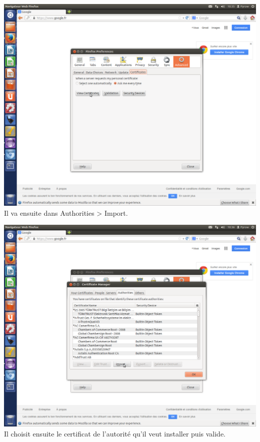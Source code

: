 \documentclass[a4paper,11pt,french]{article}
\begin{document}
\includegraphics[width=\textwidth]{images/OngletCert.png}
\newpage
Il va ensuite dans Authorities > Import.

\includegraphics[width=\textwidth]{images/OngletCA.png}
\newpage
Il choisit ensuite le certificat de l'autorité qu'il veut installer puis valide.
\end{document}
